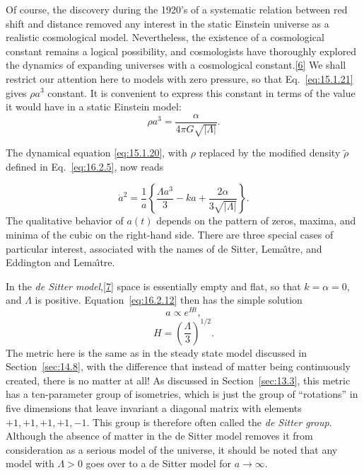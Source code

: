 Of course, the discovery during the 1920's of a systematic relation between
red shift and distance removed any interest in the static Einstein universe as
a realistic cosmological model. Nevertheless, the existence of a cosmological
constant remains a logical possibility, and cosmologists have thoroughly
explored the dynamics of expanding universes with a cosmological
constant.\hyperref[ch16-ref-6]{[6]} We shall restrict our attention here to
models with zero pressure, so that Eq.~\eqref{eq:15.1.21} gives \(\rho a^3\)
constant. It is convenient to express this constant in terms of the value it
would have in a static Einstein model:
\begin{equation}
  \rho a^3
  =
  \frac{\alpha}{4\pi G\sqrt{|\Lambda|}}.
  \tag{16.2.11}\label{eq:16.2.11}
\end{equation}
\begin{sloppypar}
The dynamical equation \eqref{eq:15.1.20}, with \(\rho\) replaced by the
modified density \(\widetilde\rho\) defined in Eq.~\eqref{eq:16.2.5}, now reads
\end{sloppypar}
\begin{equation}
  \dot a^2
  =
  \frac1a
  \left\{
    \frac{\Lambda a^3}{3}
    -ka
    +\frac{2\alpha}{3\sqrt{|\Lambda|}}
  \right\}.
  \tag{16.2.12}\label{eq:16.2.12}
\end{equation}
The qualitative behavior of \(a(t)\) depends on the pattern of zeros, maxima,
and minima of the cubic on the right-hand side. There are three special cases
of particular interest, associated with the names of de Sitter, Lema\^{\i}tre,
and Eddington and Lema\^{\i}tre.

In the \emph{de Sitter model},\hyperref[ch16-ref-7]{[7]} space is essentially
empty and flat, so that \(k=\alpha=0\), and \(\Lambda\) is positive.
Equation~\eqref{eq:16.2.12} then has the simple solution
\begin{equation}
  a\propto e^{Ht},
  \tag{16.2.13}\label{eq:16.2.13}
\end{equation}
\begin{equation}
  H=\left(\frac{\Lambda}{3}\right)^{1/2}.
  \tag{16.2.14}\label{eq:16.2.14}
\end{equation}
The metric here is the same as in the steady state model discussed in
Section~\ref{sec:14.8}, with the difference that instead of matter being
continuously created, there is no matter at all! As discussed in
Section~\ref{sec:13.3}, this metric has a ten-parameter group of isometries,
which is just the group of ``rotations'' in five dimensions that leave
invariant a diagonal matrix with elements \(+1,+1,+1,+1,-1\). This group is
therefore often called the \emph{de Sitter group}. Although the absence of
matter in the de Sitter model removes it from consideration as a serious model
of the universe, it should be noted that any model with \(\Lambda>0\) goes over
to a de Sitter model for \(a\to\infty\).

